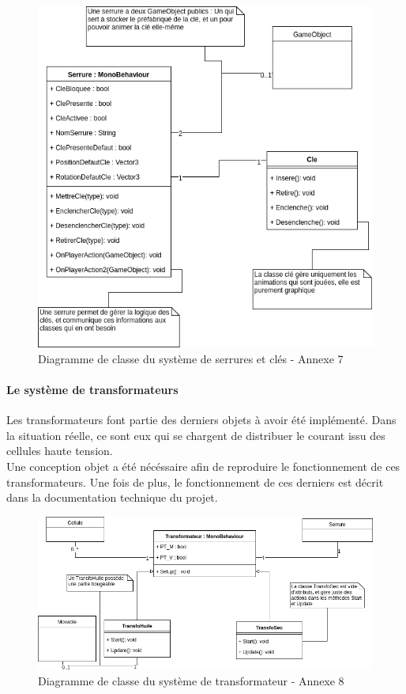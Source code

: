 \documentclass[a4paper]{article}
\begin{document}
    \begin{figure}[H]
        \centering
        \includegraphics[scale=0.35]{img/DiagClasseSerrures}
        \caption{Diagramme de classe du système de serrures et clés - Annexe 7}
    \end{figure}

    \paragraph{Le système de transformateurs}

    Les transformateurs font partie des derniers objets à avoir été implémenté. Dans la situation réelle, ce sont eux qui se chargent de distribuer le courant issu des cellules haute tension. \\

    Une conception objet a été nécéssaire afin de reproduire le fonctionnement de ces transformateurs. Une fois de plus, le fonctionnement de ces derniers est décrit dans la documentation technique du projet. \\

    \begin{figure}[H]
        \includegraphics[scale=0.3]{img/DiagClassTransformateur}
        \caption{Diagramme de classe du système de transformateur - Annexe 8}
    \end{figure}  
\end{document}
